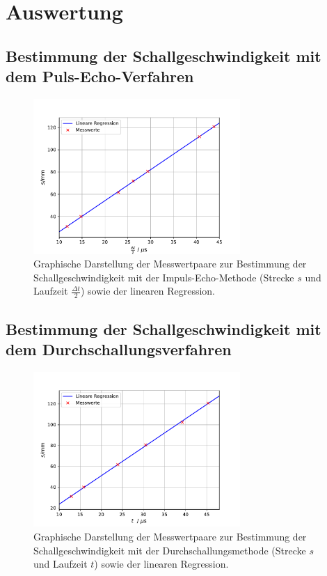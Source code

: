 \section{Auswertung}

\subsection{Bestimmung der Schallgeschwindigkeit mit dem Puls-Echo-Verfahren}



\begin{figure}[H]
  \centering
  \includegraphics[width = 0.7\textwidth]{../Messdaten/plots/schallgeschwindigkeit.pdf}
  \caption{Graphische Darstellung der Messwertpaare zur Bestimmung der Schallgeschwindigkeit
  mit der Impuls-Echo-Methode (Strecke $s$ und Laufzeit $\frac{\Delta t}{2}$) sowie der linearen Regression.}
  \label{fig: c_echo}
\end{figure}


\subsection{Bestimmung der Schallgeschwindigkeit mit dem Durchschallungsverfahren}



\begin{figure}[H]
  \centering
  \includegraphics[width = 0.7\textwidth]{../Messdaten/plots/schallgeschwindigkeit_durchschallung.pdf}
  \caption{Graphische Darstellung der Messwertpaare zur Bestimmung der Schallgeschwindigkeit
  mit der Durchschallungsmethode (Strecke $s$ und Laufzeit $t$) sowie der linearen Regression.}
  \label{fig: c_durchsschallung}
\end{figure}
